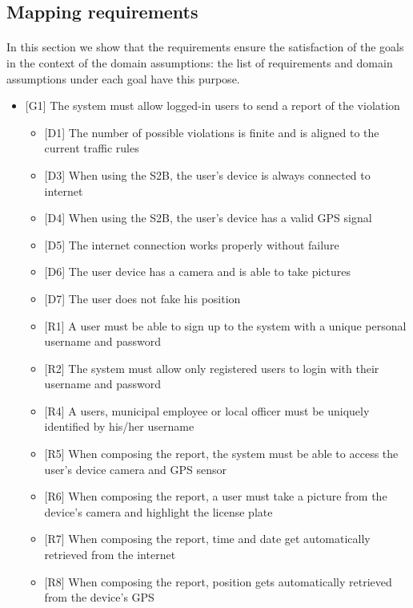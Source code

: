 				\subsection{Mapping requirements}
					\paragraph{}
						In this section we show that the requirements ensure the satisfaction of the goals in the context of the domain assumptions: the list of requirements and domain assumptions under each goal have this purpose.
					\begin{itemize}
						\item {[G1]} The system must allow logged-in users to send a report of the violation 
							\begin{itemize}
								\item {[D1]} The number of possible violations is finite and is aligned to the current traffic rules
								\item {[D3]} When using the S2B, the user's device is always connected to internet
								\item {[D4]} When using the S2B, the user's device has a valid GPS signal
								\item {[D5]} The internet connection works properly without failure
								\item {[D6]} The user device has a camera and is able to take pictures
								\item {[D7]} The user does not fake his position
								\item {[R1]} A user must be able to sign up to the system with a unique personal username and password
								\item {[R2]} The system must allow only registered users to login with their username and password
								\item {[R4]} A users, municipal employee or local officer must be uniquely identified by his/her username
								\item {[R5]} When composing the report, the system must be able to access the user's device camera and GPS sensor
								\item {[R6]} When composing the report, a user must take a picture from the device's camera and highlight the license plate
								\item {[R7]} When composing the report, time and date get automatically retrieved from the internet 
								\item {[R8]} When composing the report, position gets automatically retrieved from the device's GPS

\end{itemize}
\end{itemize}
